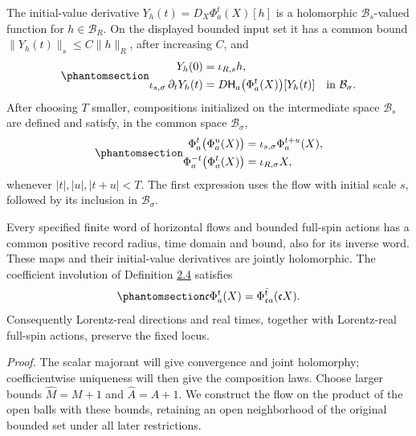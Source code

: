 \documentclass[
  english,
  11pt,
  reqno]{amsart}
\begin{document}
The initial-value derivative \(Y_h(t)=D_X\Phi_a^t(X)[h]\) is a
holomorphic \(\mathcal B_s\)-valued function for \(h\in\mathcal B_R\).
On the displayed bounded input set it has a common bound
\(\|Y_h(t)\|_s\le C\|h\|_R\), after increasing \(C\), and
\begin{equation}\protect\phantomsection\label{eq:es-flow-variational-equation}{
 \begin{aligned}
 Y_h(0)&=\iota_{R,s}h,\\
 \iota_{s,\sigma}\,\partial_tY_h(t)
   &=D\mathsf H_a\bigl(\Phi_a^t(X)\bigr)[Y_h(t)]
                         \quad\text{in }\mathcal B_\sigma.
 \end{aligned}
}\end{equation} After choosing \(T\) smaller, compositions initialized
on the intermediate space \(\mathcal B_s\) are defined and satisfy, in
the common space \(\mathcal B_\sigma\),
\begin{equation}\protect\phantomsection\label{eq:es-flow-composition}{
 \begin{aligned}
 \Phi_a^t\bigl(\Phi_a^u(X)\bigr)
       &=\iota_{s,\sigma}\Phi_a^{t+u}(X),\\
 \Phi_a^{-t}\bigl(\Phi_a^t(X)\bigr)&=\iota_{R,\sigma}X,
 \end{aligned}
}\end{equation} whenever \(|t|,|u|,|t+u|<T\). The first expression uses
the flow with initial scale \(s\), followed by its inclusion in
\(\mathcal B_\sigma\).

Every specified finite word of horizontal flows and bounded full-spin
actions has a common positive record radius, time domain and bound, also
for its inverse word. These maps and their initial-value derivatives are
jointly holomorphic. The coefficient involution of Definition
\hyperref[def:es-lorentz-involution]{2.4} satisfies
\begin{equation}\protect\phantomsection\label{eq:es-flow-reality}{
 \mathfrak c\Phi_a^t(X)
   =\Phi_{\mathfrak ca}^{\bar t}(\mathfrak cX).
}\end{equation} Consequently Lorentz-real directions and real times,
together with Lorentz-real full-spin actions, preserve the fixed locus.

\emph{Proof.} The scalar majorant will give convergence and joint
holomorphy; coefficientwise uniqueness will then give the composition
laws. Choose larger bounds \(\widehat M=M+1\) and \(\widehat A=A+1\). We
construct the flow on the product of the open balls with these bounds,
retaining an open neighborhood of the original bounded set under all
later restrictions.
\end{document}
